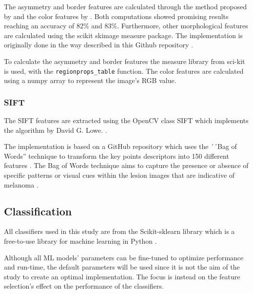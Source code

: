 \documentclass{kththesis}
\begin{document}
The asymmetry and border features are calculated through the method proposed by \parencite{inproceedings} and the color features by \parencite{celebi2008automatic}. Both computations showed promising results reaching an accuracy of 82\% and 83\%. Furthermore, other morphological features are calculated using the scikit skimage measure package. The implementation is originally done in the way described in this Github repository \parencite{melanoma-classifier}.

To calculate the asymmetry and border features the measure library from sci-kit is used, with the \verb|regionprops_table| function.
The color features are calculated using a numpy array to represent the image's RGB value.



\subsubsection{SIFT}

The SIFT features are extracted using the OpenCV class SIFT which implements the algorithm by David G. Lowe. \parencite{sift-opencv} \parencite{lowe2004distinctive}.

The implementation is based on a GitHub repository which uses the ´´Bag of Words'' technique to transform the key points descriptors into 150 different features \parencite{SIFT-repo}. The Bag of Words technique aims to capture the presence or absence of specific patterns or visual cues within the lesion images that are indicative of melanoma \parencite{9960177}.


\subsection{Classification}

All classifiers used in this study are from the Scikit-sklearn library which is a free-to-use library for machine learning in Python \parencite{scikit-learn-doc}.

Although all ML models’ parameters can be fine-tuned to optimize performance and run-time, the default parameters will be used since it is not the aim of the study to create an optimal implementation. The focus is instead on the feature selection’s effect on the performance of the classifiers.
\end{document}
